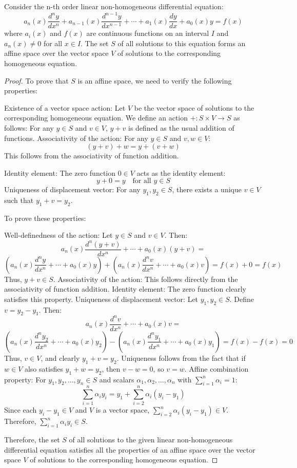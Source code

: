 \begin{theorem}
Consider the n-th order linear non-homogeneous differential equation:
\[
a_n(x)\frac{d^ny}{dx^n} + a_{n-1}(x)\frac{d^{n-1}y}{dx^{n-1}} + \cdots + a_1(x)\frac{dy}{dx} + a_0(x)y = f(x)
\]
where $a_i(x)$ and $f(x)$ are continuous functions on an interval $I$ and $a_n(x) \neq 0$ for all $x \in I$.
The set $S$ of all solutions to this equation forms an affine space over the vector space $V$ of solutions to the corresponding homogeneous equation.
\end{theorem}
\begin{proof}
To prove that $S$ is an affine space, we need to verify the following properties:

Existence of a vector space action: Let $V$ be the vector space of solutions to the corresponding homogeneous equation. We define an action $+: S \times V \to S$ as follows:
For any $y \in S$ and $v \in V$, $y + v$ is defined as the usual addition of functions.
Associativity of the action: For any $y \in S$ and $v, w \in V$:
\[
(y + v) + w = y + (v + w)
\]
This follows from the associativity of function addition.

Identity element: The zero function $0 \in V$ acts as the identity element:
\[
y + 0 = y \quad \text{for all } y \in S
\]
Uniqueness of displacement vector: For any $y_1, y_2 \in S$, there exists a unique $v \in V$ such that $y_1 + v = y_2$.

To prove these properties:

Well-definedness of the action:
Let $y \in S$ and $v \in V$. Then:
\[
a_n(x)\frac{d^n(y+v)}{dx^n} + \cdots + a_0(x)(y+v) =
\]
\[
\left(a_n(x)\frac{d^ny}{dx^n} + \cdots + a_0(x)y\right) +
\left(a_n(x)\frac{d^nv}{dx^n} + \cdots + a_0(x)v\right) = f(x) + 0 = f(x)
\]
Thus, $y + v \in S$.
Associativity of the action: This follows directly from the associativity of function addition.
Identity element: The zero function clearly satisfies this property.
Uniqueness of displacement vector:
Let $y_1, y_2 \in S$. Define $v = y_2 - y_1$. Then:
\[
a_n(x)\frac{d^nv}{dx^n} + \cdots + a_0(x)v =
\]
\[
\left(a_n(x)\frac{d^ny_2}{dx^n} + \cdots + a_0(x)y_2\right) -
\left(a_n(x)\frac{d^ny_1}{dx^n} + \cdots + a_0(x)y_1\right) = f(x) - f(x) = 0
\]
Thus, $v \in V$, and clearly $y_1 + v = y_2$. Uniqueness follows from the fact that if $w \in V$ also satisfies $y_1 + w = y_2$, then $v - w = 0$, so $v = w$.
Affine combination property:
For $y_1, y_2, \ldots, y_n \in S$ and scalars $\alpha_1, \alpha_2, \ldots, \alpha_n$ with $\sum_{i=1}^n \alpha_i = 1$:
\[
\sum_{i=1}^n \alpha_i y_i = y_1 + \sum_{i=2}^n \alpha_i (y_i - y_1)
\]
Since each $y_i - y_1 \in V$ and $V$ is a vector space, $\sum_{i=2}^n \alpha_i (y_i - y_1) \in V$.
Therefore, $\sum_{i=1}^n \alpha_i y_i \in S$.

Therefore, the set $S$ of all solutions to the given linear non-homogeneous differential equation satisfies all the properties of an affine space over the vector space $V$ of solutions to the corresponding homogeneous equation.
\end{proof}

